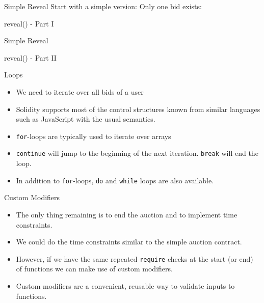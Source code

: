 \documentclass[]{beamer}
\begin{document}
\begin{frame}{Simple Reveal}
Start with a simple version: Only one bid exists:
\vspace{.3cm}
	\begin{samplecode}{reveal() - Part I}
		
	\end{samplecode}
\end{frame}

\begin{frame}{Simple Reveal}
\vspace{.3cm}
	\begin{samplecode}{reveal() - Part II}
		
	\end{samplecode}
\end{frame}

\begin{frame}{Loops}
	\begin{itemize}
		\item<1->We need to iterate over all bids of a user
		\item<2->Solidity supports most of the control structures known from similar languages such as JavaScript with the usual semantics.
		\item<3->\texttt{for}-loops are typically used to iterate over arrays
		\item<5->\texttt{continue} will jump to the beginning of the next iteration. \texttt{break} will end the loop.
		\item<6->In addition to \texttt{for}-loops, \texttt{do} and \texttt{while} loops are also available.
	\end{itemize}

	
\end{frame}

\begin{frame}{Custom Modifiers}
	\begin{itemize}
		\item<1-> The only thing remaining is to end the auction and to implement time constraints.
		\item<2-> We could do the time constraints similar to the simple auction contract.
		\item<3-> However, if we have the same repeated \texttt{require} checks at the start (or end) of functions we can make use of custom modifiers.
		\item<4-> Custom modifiers are a convenient, reusable way to validate inputs to functions.
	\end{itemize}
\end{frame}
\end{document}
